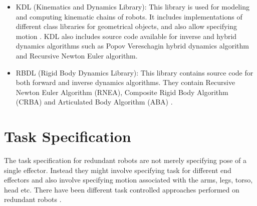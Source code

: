 \begin{itemize}
	\item KDL (Kinematics and Dynamics Library): This library is used for modeling and computing kinematic chains of robots. It includes implementations of different class libraries for geometrical objects, and also allow specifying motion \cite{kdl}. KDL also includes source code available for inverse and hybrid dynamics algorithms such as Popov Vereschagin hybrid dynamics algorithm and Recursive Newton Euler algorithm. 
	\item RBDL (Rigid Body Dynamics Library): This library contains source code for both forward and inverse dynamics algorithms. They contain Recursive Newton Euler Algorithm (RNEA), Composite Rigid Body Algorithm (CRBA) and Articulated Body Algorithm (ABA) \cite{felis2017rbdl}.
\end{itemize}

\section{Task Specification} 
The task specification for redundant robots are not merely specifying pose of a single effector. Instead they might involve specifying task for different end effectors and also involve specifying motion associated with the arms, legs, torso, head etc. There have been different task controlled approaches performed on redundant robots \cite{khatib2004whole}.		

